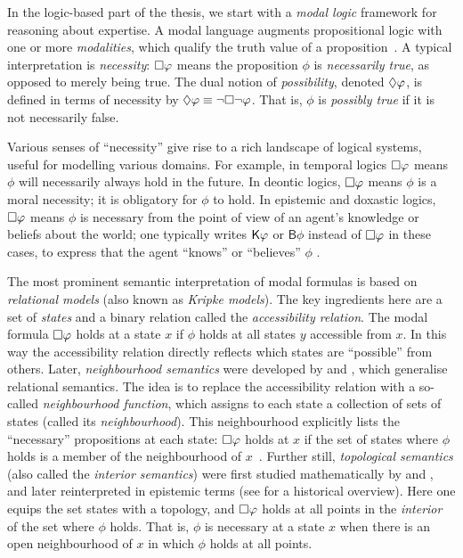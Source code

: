{



In the logic-based part of the thesis, we start with a \emph{modal logic}
framework for reasoning about expertise. A modal language augments
propositional logic with one or more \emph{modalities}, which qualify
the truth value of a proposition~\cite{seplogicmodal}. A typical interpretation
is \emph{necessity}: $\Box\varphi$ means the proposition $\phi$ is
\emph{necessarily true}, as opposed to merely being true. The dual notion of
\emph{possibility}, denoted $\Diamond\varphi$, is defined in terms of necessity
by $\Diamond\varphi \equiv \neg\Box\neg\varphi$. That is, $\phi$ is
\emph{possibly true} if it is not necessarily false.

Various senses of ``necessity'' give rise to a rich landscape of logical
systems, useful for modelling various domains. For example, in temporal logics
$\Box\varphi$ means $\phi$ will necessarily always hold in the future. In
deontic logics, $\Box\varphi$ means $\phi$ is a moral necessity; it is
obligatory for $\phi$ to hold. In epistemic and doxastic logics,
$\Box\varphi$ means $\phi$ is necessary from the point of view of an agent's
knowledge or beliefs about the world; one typically writes $\mathsf{K}\varphi$ or
$\mathsf{B}\phi$ instead of $\Box\varphi$ in these cases, to express that the
agent ``knows'' or ``believes'' $\phi$ .

The most prominent semantic interpretation of modal formulas is based on
\emph{relational models} (also known as \emph{Kripke models}). The key
ingredients here are a set of \emph{states} and a binary relation called the
\emph{accessibility relation}. The modal formula $\Box\varphi$ holds at a
state $x$ if $\phi$ holds at all states $y$ accessible from $x$.\footnotemark{}
In this way the accessibility relation directly reflects which states are
``possible'' from others.
%
Later, \emph{neighbourhood semantics} were developed by \textcite{Scott1970}
and \textcite{montague1970universal}, which generalise relational semantics.
The idea is to replace the accessibility relation with a so-called
\emph{neighbourhood function}, which assigns to each state a collection of sets
of states (called its \emph{neighbourhood}). This neighbourhood explicitly
lists the ``necessary'' propositions at each state: $\Box\varphi$ holds at
$x$ if the set of states where $\phi$ holds is a member of the neighbourhood of
$x$~\cite{pacuit2017neighborhood}.
%
Further still, \emph{topological semantics} (also called the \emph{interior
semantics}) were first studied mathematically by \textcite{mckinsey41} and
\textcite{mckinseytarski44}, and later reinterpreted in epistemic terms (see
\textcite[Chapter 1]{ozgun_evidence} for a historical overview). Here one
equips the set states with a topology, and $\Box\varphi$ holds at all points
in the \emph{interior} of the set where $\phi$ holds. That is, $\phi$ is
necessary at a state $x$ when there is an open neighbourhood of $x$ in which
$\phi$ holds at all points.

}
